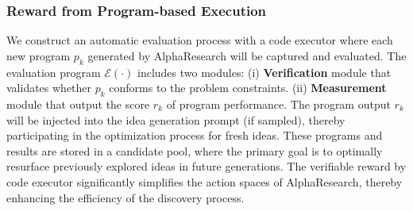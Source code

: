 \subsubsection{Reward from Program-based Execution}
We construct an automatic evaluation process with a code executor where each new program $p_k$ generated by AlphaResearch will be captured and evaluated. 
The evaluation program $\mathcal{E}(\cdot)$ includes two modules: (i) \textbf{Verification} module that validates whether $p_k$ conforms to the problem constraints. (ii) \textbf{Measurement} module that output the score $r_k$ of program performance.
The program output $r_k$ will be injected into the idea generation prompt (if sampled), thereby participating in the optimization process for fresh ideas. These programs and results are stored in a candidate pool, where the primary goal is to optimally resurface previously explored ideas in future generations. The verifiable reward by code executor significantly simplifies the action spaces of AlphaResearch, thereby enhancing the efficiency of the discovery process. 
